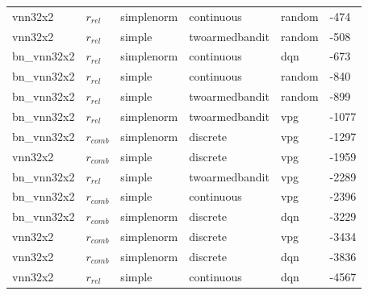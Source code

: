 \begin{table}[]
{\begin{tabular}{l|l|l|l|l|l}
            vnn32x2          &       $r_{rel}$        &       simplenorm             &   continuous         & random               & -474       \\
            vnn32x2          &       $r_{rel}$        &       simple                 &   twoarmedbandit     & random               & -508       \\
            bn\_vnn32x2      &       $r_{rel}$        &       simplenorm             &   continuous         & dqn                  & -673       \\
            bn\_vnn32x2      &       $r_{rel}$        &       simple                 &   continuous         & random               & -840       \\
            bn\_vnn32x2      &       $r_{rel}$        &       simple                 &   twoarmedbandit     & random               & -899       \\
            bn\_vnn32x2      &       $r_{rel}$        &       simplenorm             &   twoarmedbandit     & vpg                  & -1077      \\
            bn\_vnn32x2      &       $r_{comb}$       &       simplenorm             &   discrete           & vpg                  & -1297      \\
            vnn32x2          &       $r_{comb}$       &       simple                 &   discrete           & vpg                  & -1959      \\
            bn\_vnn32x2      &       $r_{rel}$        &       simple                 &   twoarmedbandit     & vpg                  & -2289      \\
            bn\_vnn32x2      &       $r_{comb}$       &       simple                 &   continuous         & vpg                  & -2396      \\
            bn\_vnn32x2      &       $r_{comb}$       &       simplenorm             &   discrete           & dqn                  & -3229      \\
            vnn32x2          &       $r_{comb}$       &       simplenorm             &   discrete           & vpg                  & -3434      \\
            vnn32x2          &       $r_{comb}$       &       simplenorm             &   discrete           & dqn                  & -3836      \\
            vnn32x2          &       $r_{rel}$        &       simple                 &   continuous         & dqn                  & -4567      \\

\end{tabular}}
\end{table}
